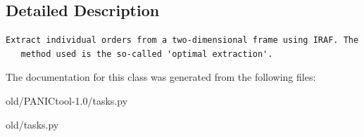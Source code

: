 \subsection{Detailed Description}


\footnotesize\begin{verbatim}Extract individual orders from a two-dimensional frame using IRAF. The
   method used is the so-called 'optimal extraction'.
\end{verbatim}
\normalsize
 



The documentation for this class was generated from the following files:\begin{CompactItemize}
\item 
old/PANICtool-1.0/tasks.py\item 
old/tasks.py\end{CompactItemize}
